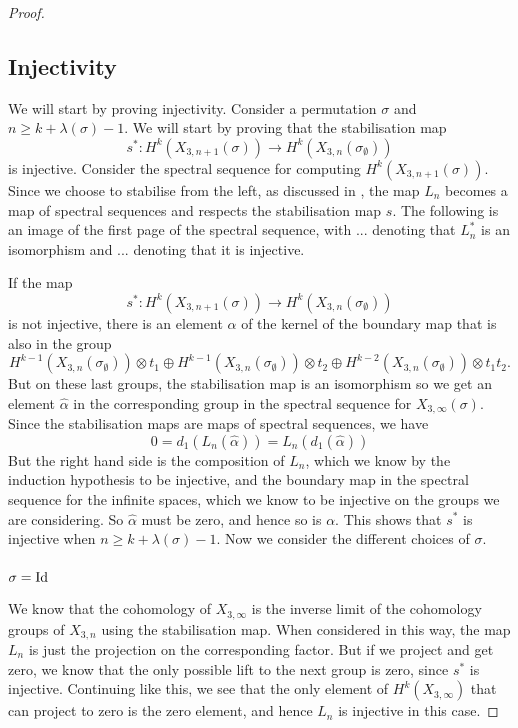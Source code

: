 \begin{proof}
\subsection{Injectivity}

We will start by proving injectivity. Consider a permutation $\sigma$
and $n \geq k + \lambda(\sigma) - 1$. We will start by proving that
the stabilisation map
\[ s^* : H^k(X_{3,n+1}(\sigma)) \to
H^k(X_{3,n}(\sigma_{\emptyset})) \] 
is injective. Consider the spectral sequence for computing
$H^k(X_{3,n+1}(\sigma))$. Since we choose to stabilise from the left,
as discussed in , the map $L_n$
becomes a map of spectral sequences and respects the stabilisation map
$s$. The
following is an image of the first page of the spectral sequence, with
... denoting that $L_n^*$ is an isomorphism and ... denoting
that it is injective. 

If the map 
\[ s^* : H^k(X_{3,n+1}(\sigma)) \to
H^k(X_{3,n}(\sigma_{\emptyset})) \]
is not injective, there is an element $\alpha$ of the kernel of the
boundary map that is also in the group 
\[ H^{k-1}(X_{3,n}(\sigma_{\emptyset})) \otimes t_1 \oplus 
H^{k-1}(X_{3,n}(\sigma_{\emptyset})) \otimes t_2 \oplus 
H^{k-2}(X_{3,n}(\sigma_{\emptyset})) \otimes t_1 t_2. \]
But on these last groups, the stabilisation map is an isomorphism so
we get an element $\widehat{\alpha}$ in the corresponding group in the
spectral sequence for $X_{3,\infty}(\sigma)$. Since the stabilisation
maps are maps of spectral sequences, we have
\[ 0 = d_1(L_{n}(\widehat{\alpha})) = L_n(d_1(\widehat{\alpha})) \]
But the right hand side is the composition of $L_n$, which we know by
the induction hypothesis to be injective, and the boundary map in the
spectral sequence for the infinite spaces, which we know to be
injective on the groups we are considering. So $\widehat{\alpha}$ must
be zero, and hence so is $\alpha$. This shows that $s^*$ is injective
when $n \geq k + \lambda(\sigma) - 1$. Now we consider the different
choices of $\sigma$.

\subsubsection{$\sigma = \operatorname{Id}$}

We know that the cohomology of $X_{3,\infty}$ is the inverse
limit of the cohomology groups of $X_{3,n}$ using the stabilisation
map. 
When considered in this way, the map $L_n$ is just the projection on
the corresponding factor. But if we project and get zero, we know that
the only possible lift to the next group is zero, since $s^*$ is
injective. Continuing like this, we see that the only element of
$H^k(X_{3,\infty})$ that can project to zero is the zero element, and
hence $L_n$ is injective in this case.


\end{proof}
